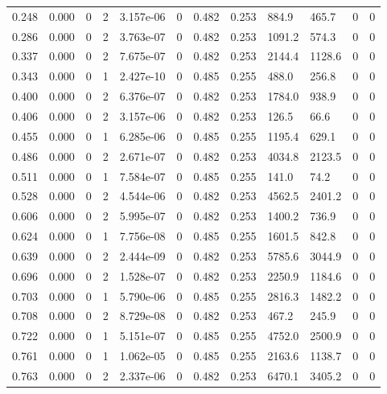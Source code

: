 \documentclass[preview]{standalone}
\begin{document}
{{\begin{tabular}{L{1.2cm}C{1.2cm} C{0.3cm}C{0.5cm} C{1.4cm}C{1.4cm} C{1.4cm}C{1.4cm} C{1.6cm}C{1.6cm} C{1.6cm}C{1.6cm}}
  0.248  &  0.000  & 0     &  2 &  3.157e-06  & 0  &  0.482&   0.253& 884.9 & 465.7   &  0 & 0  \\ 
  0.286  &  0.000  & 0     &  2 &  3.763e-07  & 0  &  0.482&   0.253& 1091.2 & 574.3   &  0 & 0  \\ 
  0.337  &  0.000  & 0     &  2 &  7.675e-07  & 0  &  0.482&   0.253& 2144.4 & 1128.6   &  0 & 0  \\ 
  0.343  &  0.000  & 0     &  1 &  2.427e-10  & 0  &  0.485&   0.255& 488.0 & 256.8   &  0 & 0  \\ 
  0.400  &  0.000  & 0     &  2 &  6.376e-07  & 0  &  0.482&   0.253& 1784.0 & 938.9   &  0 & 0  \\ 
  0.406  &  0.000  & 0     &  2 &  3.157e-06  & 0  &  0.482&   0.253& 126.5 & 66.6   &  0 & 0  \\ 
  0.455  &  0.000  & 0     &  1 &  6.285e-06  & 0  &  0.485&   0.255& 1195.4 & 629.1   &  0 & 0  \\ 
  0.486  &  0.000  & 0     &  2 &  2.671e-07  & 0  &  0.482&   0.253& 4034.8 & 2123.5   &  0 & 0  \\ 
  0.511  &  0.000  & 0     &  1 &  7.584e-07  & 0  &  0.485&   0.255& 141.0 & 74.2   &  0 & 0  \\ 
  0.528  &  0.000  & 0     &  2 &  4.544e-06  & 0  &  0.482&   0.253& 4562.5 & 2401.2   &  0 & 0  \\ 
  0.606  &  0.000  & 0     &  2 &  5.995e-07  & 0  &  0.482&   0.253& 1400.2 & 736.9   &  0 & 0  \\ 
  0.624  &  0.000  & 0     &  1 &  7.756e-08  & 0  &  0.485&   0.255& 1601.5 & 842.8   &  0 & 0  \\ 
  0.639  &  0.000  & 0     &  2 &  2.444e-09  & 0  &  0.482&   0.253& 5785.6 & 3044.9   &  0 & 0  \\ 
  0.696  &  0.000  & 0     &  2 &  1.528e-07  & 0  &  0.482&   0.253& 2250.9 & 1184.6   &  0 & 0  \\ 
  0.703  &  0.000  & 0     &  1 &  5.790e-06  & 0  &  0.485&   0.255& 2816.3 & 1482.2   &  0 & 0  \\ 
  0.708  &  0.000  & 0     &  2 &  8.729e-08  & 0  &  0.482&   0.253& 467.2 & 245.9   &  0 & 0  \\ 
  0.722  &  0.000  & 0     &  1 &  5.151e-07  & 0  &  0.485&   0.255& 4752.0 & 2500.9   &  0 & 0  \\ 
  0.761  &  0.000  & 0     &  1 &  1.062e-05  & 0  &  0.485&   0.255& 2163.6 & 1138.7   &  0 & 0  \\ 
  0.763  &  0.000  & 0     &  2 &  2.337e-06  & 0  &  0.482&   0.253& 6470.1 & 3405.2   &  0 & 0  \\ 

\end{tabular}}}
\end{document}
